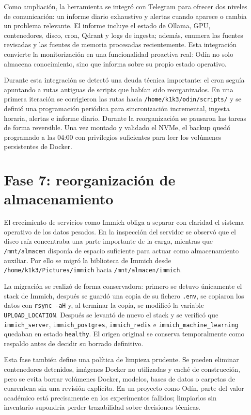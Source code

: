 Como ampliación, la herramienta se integró con Telegram para ofrecer dos niveles de comunicación: un informe diario exhaustivo y alertas cuando aparece o cambia un problema relevante. El informe incluye el estado de Ollama, GPU, contenedores, disco, cron, Qdrant y logs de ingesta; además, enumera las fuentes revisadas y las fuentes de memoria procesadas recientemente. Esta integración convierte la monitorización en una funcionalidad proactiva real: Odín no solo almacena conocimiento, sino que informa sobre su propio estado operativo.

Durante esta integración se detectó una deuda técnica importante: el cron seguía apuntando a rutas antiguas de scripts que habían sido reorganizados. En una primera iteración se corrigieron las rutas hacia \texttt{/home/k1k3/odin/scripts/} y se definió una programación periódica para sincronización incremental, ingesta horaria, alertas e informe diario. Durante la reorganización se pausaron las tareas de forma reversible. Una vez montado y validado el NVMe, el backup quedó programado a las 04:00 con privilegios suficientes para leer los volúmenes persistentes de Docker.

\section{Fase 7: reorganización de almacenamiento}
El crecimiento de servicios como Immich obliga a separar con claridad el sistema operativo de los datos pesados. En la inspección del servidor se observó que el disco raíz concentraba una parte importante de la carga, mientras que \texttt{/mnt/almacen} disponía de espacio suficiente para actuar como almacenamiento auxiliar. Por ello se migró la biblioteca de Immich desde \texttt{/home/k1k3/Pictures/immich} hacia \texttt{/mnt/almacen/immich}.

La migración se realizó de forma conservadora: primero se detuvo únicamente el stack de Immich, después se guardó una copia de su fichero \texttt{.env}, se copiaron los datos con \texttt{rsync -aH} y, al terminar la copia, se modificó la variable \texttt{UPLOAD\_LOCATION}. Después se levantó de nuevo el stack y se verificó que \texttt{immich\_server}, \texttt{immich\_postgres}, \texttt{immich\_redis} e \texttt{immich\_machine\_learning} quedaban en estado \texttt{healthy}. El origen original se conserva temporalmente como respaldo antes de decidir su borrado definitivo.

Esta fase también define una política de limpieza prudente. Se pueden eliminar contenedores detenidos, imágenes Docker no utilizadas y caché de construcción, pero se evita borrar volúmenes Docker, modelos, bases de datos o carpetas de cuarentena sin una revisión explícita. En un proyecto como Odín, parte del valor académico está precisamente en los experimentos fallidos; limpiarlos sin inventario supondría perder trazabilidad sobre decisiones técnicas.

